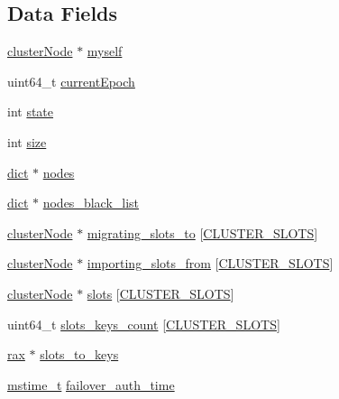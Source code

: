 \subsection*{Data Fields}
\begin{DoxyCompactItemize}
\item 
\hyperlink{structcluster_node}{cluster\+Node} $\ast$ \hyperlink{structcluster_state_aff69bee08a3a0a58166a9f85acf12d56}{myself}
\item 
uint64\+\_\+t \hyperlink{structcluster_state_a97f41589e815c407f015841f5a3d816f}{current\+Epoch}
\item 
int \hyperlink{structcluster_state_a89f234133d3efe315836311cbf21c64b}{state}
\item 
int \hyperlink{structcluster_state_a439227feff9d7f55384e8780cfc2eb82}{size}
\item 
\hyperlink{structdict}{dict} $\ast$ \hyperlink{structcluster_state_a6e18e71a503d78c25fa93a49e05bf6f4}{nodes}
\item 
\hyperlink{structdict}{dict} $\ast$ \hyperlink{structcluster_state_a0dec12e8b1bd71942304f8073656d023}{nodes\+\_\+black\+\_\+list}
\item 
\hyperlink{structcluster_node}{cluster\+Node} $\ast$ \hyperlink{structcluster_state_a95946e1c3598728041d63dfdb7b179df}{migrating\+\_\+slots\+\_\+to} \mbox{[}\hyperlink{cluster_8h_aa3e2cb951eebb16725ecc3f5beefd9fd}{C\+L\+U\+S\+T\+E\+R\+\_\+\+S\+L\+O\+TS}\mbox{]}
\item 
\hyperlink{structcluster_node}{cluster\+Node} $\ast$ \hyperlink{structcluster_state_a1268626116ae576c7bb7dcdd60f43ccf}{importing\+\_\+slots\+\_\+from} \mbox{[}\hyperlink{cluster_8h_aa3e2cb951eebb16725ecc3f5beefd9fd}{C\+L\+U\+S\+T\+E\+R\+\_\+\+S\+L\+O\+TS}\mbox{]}
\item 
\hyperlink{structcluster_node}{cluster\+Node} $\ast$ \hyperlink{structcluster_state_a1eb411c5aaa32d0d3c2ac0c5e9dde892}{slots} \mbox{[}\hyperlink{cluster_8h_aa3e2cb951eebb16725ecc3f5beefd9fd}{C\+L\+U\+S\+T\+E\+R\+\_\+\+S\+L\+O\+TS}\mbox{]}
\item 
uint64\+\_\+t \hyperlink{structcluster_state_acd00e4aea7a23f7498525dc50671c66f}{slots\+\_\+keys\+\_\+count} \mbox{[}\hyperlink{cluster_8h_aa3e2cb951eebb16725ecc3f5beefd9fd}{C\+L\+U\+S\+T\+E\+R\+\_\+\+S\+L\+O\+TS}\mbox{]}
\item 
\hyperlink{structrax}{rax} $\ast$ \hyperlink{structcluster_state_a2dd4e8e6e414888eee838a96e2573ae8}{slots\+\_\+to\+\_\+keys}
\item 
\hyperlink{redismodule_8h_a652ae61e2475bc8957454534544968fc}{mstime\+\_\+t} \hyperlink{structcluster_state_a6acb8999815edbd474cb3fc1e31681e6}{failover\+\_\+auth\+\_\+time}

\end{DoxyCompactItemize}
